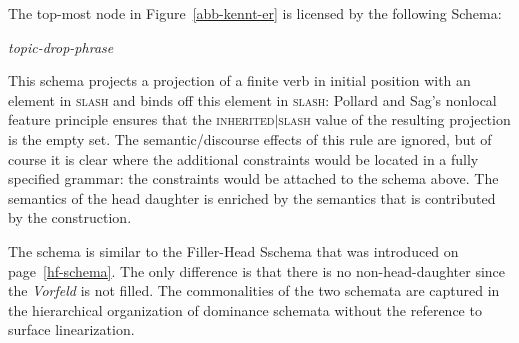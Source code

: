 The top-most node in Figure~\ref{abb-kennt-er} is licensed by the following Schema:

\begin{schema}
\textit{topic-drop-phrase} \impl\\
\end{schema}

\noindent
This schema projects a projection of a finite verb in initial position with an element
in \textsc{slash} and binds off this element in \textsc{slash}: Pollard and Sag's
nonlocal feature principle ensures that the \textsc{inherited$|$slash} value of the resulting projection is the
empty set. The semantic/discourse effects of this rule are ignored, but of course it is clear where
the additional constraints would be located in a fully specified grammar: the constraints would be
attached to the schema above. The semantics of the head daughter is enriched by the semantics that
is contributed by the construction.

The schema is similar to the Filler-Head Sschema that was introduced on page~\ref{hf-schema}.
The only difference is that there is no non-head-daughter since the \textit{Vorfeld} is not filled.
The commonalities of the two schemata are captured in the hierarchical organization 
of dominance schemata without the reference to surface linearization.



